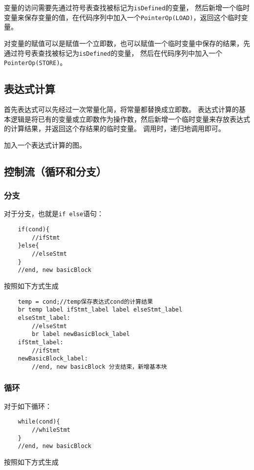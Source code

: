变量的访问需要先通过符号表查找被标记为\texttt{isDefined}的变量，
然后新增一个临时变量来保存变量的值，在代码序列中加入一个\texttt{PointerOp(LOAD)}，返回这个临时变量。

对变量的赋值可以是赋值一个立即数，也可以赋值一个临时变量中保存的结果，先通过符号表查找被标记为\texttt{isDefined}的变量，
然后在代码序列中加入一个\texttt{PointerOp(STORE)}。

\subsection{表达式计算}

首先表达式可以先经过一次常量化简，将常量都替换成立即数。
表达式计算的基本逻辑是将已有的变量或立即数作为操作数，然后新增一个临时变量来存放表达式的计算结果，并返回这个存结果的临时变量。
调用时，递归地调用即可。

\todo 加入一个表达式计算的图。

\subsection{控制流（循环和分支）}
\subsubsection{分支}
对于分支，也就是\texttt{if else}语句：

\begin{verbatim}
    if(cond){
        //ifStmt
    }else{
        //elseStmt
    }
    //end, new basicBlock
\end{verbatim}
按照如下方式生成

\begin{verbatim}
    temp = cond;//temp保存表达式cond的计算结果
    br temp label ifStmt_label label elseStmt_label
    elseStmt_label:
        //elseStmt
        br label newBasicBlock_label
    ifStmt_label:
        //ifStmt
    newBasicBlock_label:
        //end, new basicBlock 分支结束，新增基本块
\end{verbatim}

\subsubsection{循环}
对于如下循环：
\begin{verbatim}
    while(cond){
        //whileStmt
    }
    //end, new basicBlock
\end{verbatim}

按照如下方式生成

